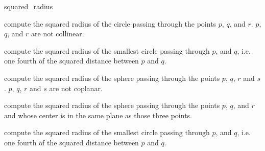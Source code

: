 \begin{ccRefFunction}{squared_radius}

 {compute the squared radius of the circle passing through the points
 $p$, $q$, and $r$.  \ccPrecond $p$, $q$, and $r$ are not collinear.}

{compute the squared radius of the smallest circle passing through $p$,
and $q$, i.e. one fourth of the squared distance between $p$ and $q$.}

 {compute the squared radius of the sphere passing through the points $p$,
 $q$, $r$ and $s$.  \ccPrecond $p$, $q$, $r$ and $s$ are not coplanar.}

 {compute the squared radius of the sphere passing through the points $p$,
 $q$, and $r$ and whose center is in the same plane as those three points.}

{compute the squared radius of the smallest circle passing through $p$,
and $q$, i.e. one fourth of the squared distance between $p$ and $q$.}

\ccSeeAlso
{} \\
 \\
 \\

\end{ccRefFunction}
